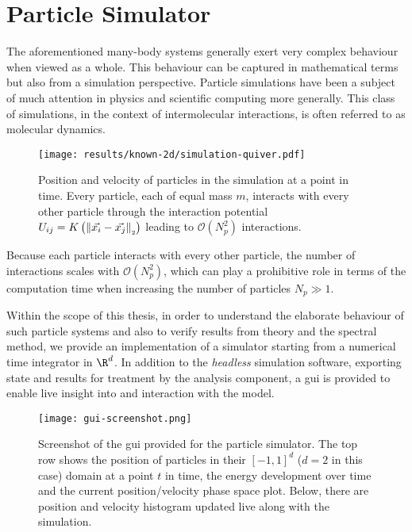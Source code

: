 \chapter{Particle Simulator}
\label{chap:particle-simulator}

The aforementioned many-body systems generally exert very complex behaviour when viewed as a whole.
This behaviour can be captured in mathematical terms but also from a simulation perspective.
Particle simulations have been a subject of much attention in physics and scientific computing more generally.
This class of simulations, in the context of intermolecular interactions, is often referred to as molecular dynamics.

\begin{figure}[H]
  \centering
  \texttt{[image: results/known-2d/simulation-quiver.pdf]}
  \caption[Quiver plot of 120 particles in 2D interacting through the attractive-repulsive potential]{Position and velocity of particles in the simulation at a point in time. Every particle, each of equal mass $m$, interacts with every other particle through the interaction potential $U_{ij} = K\left(\left\lVert\vec{x_i} - \vec{x_j}\right\rVert_{\scriptscriptstyle 2}\right)$ leading to $\mathcal{O}(N_p^2)$ interactions.}
  \label{fig:simulation-quiver}
\end{figure}

Because each particle interacts with every other particle, the number of interactions scales with $\mathcal{O}(N_p^2)$,
which can play a prohibitive role in terms of the computation time when increasing the number of particles $N_p \gg 1$.

Within the scope of this thesis, in order to understand the elaborate behaviour of such particle systems and also to verify results from theory and the spectral method, we provide an implementation of a simulator starting from a numerical time integrator in $\R^d$.
In addition to the \textit{headless} simulation software, exporting state and results for treatment by the analysis component, a \gls{gui} is provided to enable live insight into and interaction with the model.

\begin{figure}[H]
  \centering
  \texttt{[image: gui-screenshot.png]}
  \caption[Graphical User Interface of the Simulator]{Screenshot of the \gls{gui} provided for the particle simulator. The top row shows the position of particles in their $[-1, 1]^d$ ($d = 2$ in this case) domain at a point $t$ in time, the energy development over time and the current position/velocity phase space plot. Below, there are position and velocity histogram updated live along with the simulation.}
  \label{fig:gui-screenshot}
\end{figure}

